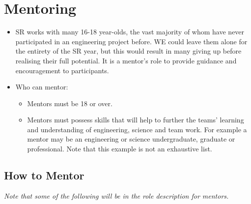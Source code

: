 \section{Mentoring}

\begin{itemize}
\item SR works with many 16-18 year-olds, the vast majority of whom have never participated in an engineering project before.  WE could leave them alone for the entirety of the SR year, but this would result in many giving up before realising their full potential.  It is a mentor's role to provide guidance and encouragement to participants.

\item Who can mentor:
  \begin{itemize}
  \item Mentors must be 18 or over.
  \item Mentors must possess skills that will help to further the teams' learning and understanding of engineering, science and team work. For example a mentor may be an engineering or science undergraduate, graduate or professional. Note that this example is not an exhaustive list.
  \end{itemize}
\end{itemize}

\subsection{How to Mentor}

\textit{Note that some of the following will be in the role description for mentors.}

